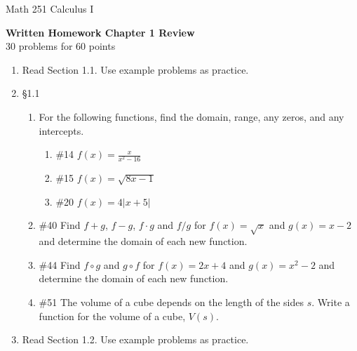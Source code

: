 \documentclass[11pt]{report}
\theoremstyle{plain}
\begin{document}
\hfill Math 251 Calculus I
\begin{center}
\Large{\textbf{Written Homework Chapter 1 Review}} \\
30 problems for 60 points\\
\end{center}
\begin{enumerate}
\item Read Section 1.1. Use example problems as practice.

\item{\S 1.1}
	\begin{enumerate}
	\item For the following functions, find the domain, range, any zeros, and any intercepts.
		\begin{enumerate}
		\item \#14 $f(x) = \frac{x}{x^2-16}$\\
		\item \#15 $f(x)=\sqrt{8x-1}$\\
		\item \#20 $f(x)=4 \vert x+5 \vert$
		\end{enumerate}
	\item \#40 Find $f+g$, $f-g$, $f \cdot g$ and $f/g$ for $f(x)=\sqrt{x}$ and $g(x)=x-2$ and determine the domain of each new function.
	\item \#44 Find $f \circ g$ and $g \circ f$ for $f(x)=2x+4$ and $g(x)=x^2-2$ and determine the domain of each new function.
	\item \#51 The volume of a cube depends on the length of the sides $s$. Write a function for the volume of a cube, $V(s)$.
	\end{enumerate}
	
\item Read Section 1.2. Use example problems as practice.


\end{enumerate}
\end{document}
